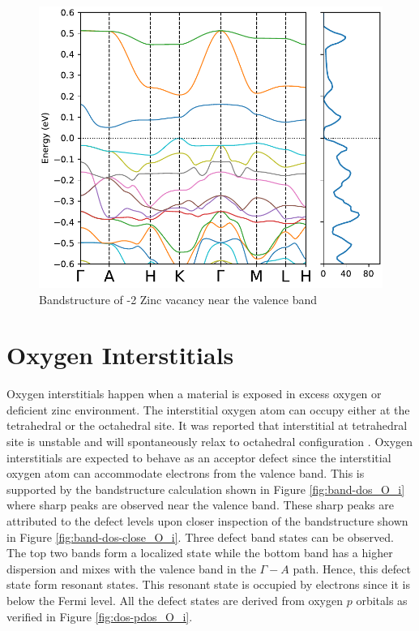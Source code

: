 \begin{figure}[tbh!]
	\centering
	\includegraphics[width=0.6\linewidth]{"images/rnd/band-dos-close_Zn_vac-n2"}
	\caption[Bandstructure of -2 Zinc vacancy near the valence band]{Bandstructure of -2 Zinc vacancy near the valence band}
	\label{fig:band-dos-close_Zn_vac-n2}
\end{figure}

\clearpage

\section{Oxygen Interstitials}
Oxygen interstitials happen when a material is exposed in excess oxygen or deficient zinc environment. The interstitial oxygen atom can occupy either at the tetrahedral or the octahedral site. It was reported that interstitial at tetrahedral site is unstable and will spontaneously relax to octahedral configuration \citep{Erhart2005}. Oxygen interstitials are expected to behave as an acceptor defect since the interstitial oxygen atom can accommodate electrons from the valence band. This is supported by the bandstructure calculation shown in Figure \ref{fig:band-dos_O_i} where sharp peaks are observed near the valence band.  These sharp peaks are attributed to the defect levels upon  closer inspection of the bandstructure shown in Figure \ref{fig:band-dos-close_O_i}. Three defect band states can be observed. The top two bands form a localized state while the bottom band has a higher dispersion and mixes with the valence band in the $\Gamma-A$ path. Hence, this defect state form resonant states. This resonant state is occupied by electrons since it is below the Fermi level. All the defect states are derived from oxygen $p$ orbitals as verified in Figure \ref{fig:dos-pdos_O_i}.

